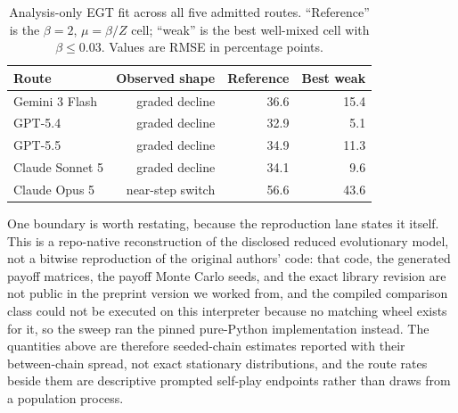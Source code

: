 \documentclass[sigconf,anonymous]{aamas}
\begin{document}
\begin{table}[t]
    \caption{Analysis-only EGT fit across all five admitted routes. ``Reference''
    is the $\beta=2$, $\mu=\beta/Z$ cell; ``weak'' is the best well-mixed cell
    with $\beta\leq 0.03$. Values are RMSE in percentage points.}
    \label{tab:egt-five-route-fit}
    \centering
    \scriptsize
    \begin{tabular}{@{}lrrr@{}}
        \toprule
        Route & Observed shape & Reference & Best weak \\
        \midrule
        Gemini 3 Flash  & graded decline & 36.6 & 15.4 \\
        GPT-5.4         & graded decline & 32.9 &  5.1 \\
        GPT-5.5         & graded decline & 34.9 & 11.3 \\
        Claude Sonnet 5 & graded decline & 34.1 &  9.6 \\
        Claude Opus 5   & near-step switch & 56.6 & 43.6 \\
        \bottomrule
    \end{tabular}
\end{table}

One boundary is worth restating, because the reproduction lane states it
itself. This is a repo-native reconstruction of the disclosed reduced
evolutionary model, not a bitwise reproduction of the original authors' code:
that code, the generated payoff matrices, the payoff Monte Carlo seeds, and
the exact library revision are not public in the preprint version we worked
from, and the compiled comparison class could not be executed on this
interpreter because no matching wheel exists for it, so the sweep ran the
pinned pure-Python implementation instead. The quantities above are therefore
seeded-chain estimates reported with their between-chain spread, not exact
stationary distributions, and the route rates beside them are descriptive
prompted self-play endpoints rather than draws from a population process.
\end{document}
